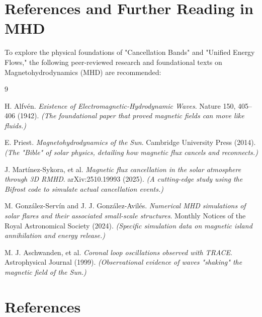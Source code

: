 \documentclass[11pt]{article}
\begin{document}
\section*{References and Further Reading in MHD}

To explore the physical foundations of "Cancellation Bands" and "Unified Energy Flows," the following peer-reviewed research and foundational texts on Magnetohydrodynamics (MHD) are recommended:

\begin{thebibliography}{9}

H. Alfvén. 
\textit{Existence of Electromagnetic-Hydrodynamic Waves}. 
Nature 150, 405–406 (1942). 
\textit{(The foundational paper that proved magnetic fields can move like fluids.)}

E. Priest. 
\textit{Magnetohydrodynamics of the Sun}. 
Cambridge University Press (2014). 
\textit{(The "Bible" of solar physics, detailing how magnetic flux cancels and reconnects.)}

J. Martínez-Sykora, et al. 
\textit{Magnetic flux cancellation in the solar atmosphere through 3D RMHD}. 
arXiv:2510.19993 (2025). 
\textit{(A cutting-edge study using the Bifrost code to simulate actual cancellation events.)}

M. González-Servín and J. J. González-Avilés. 
\textit{Numerical MHD simulations of solar flares and their associated small-scale structures}. 
Monthly Notices of the Royal Astronomical Society (2024). 
\textit{(Specific simulation data on magnetic island annihilation and energy release.)}

M. J. Aschwanden, et al. 
\textit{Coronal loop oscillations observed with TRACE}. 
Astrophysical Journal (1999). 
\textit{(Observational evidence of waves "shaking" the magnetic field of the Sun.)}

\end{thebibliography}

\section*{References}
\end{document}
